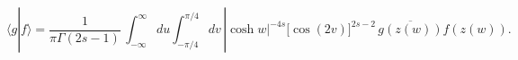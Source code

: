 \begin{equation}
\langle g|f\rangle =\frac{1}{\pi\Gamma(2s-1)}\,
\int_{-\infty}^{\infty}du\int_{-\pi/4}^{\pi/4}dv\,|\cosh w|^{-4s}
\bigl[\cos(2v)\bigr]^{2s-2}\,\overline{g(z(w))}f(z(w)).
\label{inner}
\end{equation}

